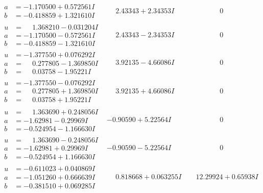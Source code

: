 \documentclass[1p]{elsarticle_modified}
\theoremstyle{definition}
\begin{document}
$$\begin{array}{c|c|c}
\begin{aligned}
a &= -1.170500 + 0.572561 I \\
b &= -0.418859 + 1.321610 I\end{aligned}
 & \phantom{-}2.43343 + 2.34353 I & \phantom{-0.000000 } 0 \\ \hline\begin{aligned}
u &= \phantom{-}1.368210 - 0.031204 I \\
a &= -1.170500 - 0.572561 I \\
b &= -0.418859 - 1.321610 I\end{aligned}
 & \phantom{-}2.43343 - 2.34353 I & \phantom{-0.000000 } 0 \\ \hline\begin{aligned}
u &= -1.377550 + 0.076292 I \\
a &= \phantom{-}0.277805 - 1.369850 I \\
b &= \phantom{-}0.03758 - 1.95221 I\end{aligned}
 & \phantom{-}3.92135 - 4.66086 I & \phantom{-0.000000 } 0 \\ \hline\begin{aligned}
u &= -1.377550 - 0.076292 I \\
a &= \phantom{-}0.277805 + 1.369850 I \\
b &= \phantom{-}0.03758 + 1.95221 I\end{aligned}
 & \phantom{-}3.92135 + 4.66086 I & \phantom{-0.000000 } 0 \\ \hline\begin{aligned}
u &= \phantom{-}1.363690 + 0.248056 I \\
a &= -1.62981 - 0.29969 I \\
b &= -0.524954 - 1.166630 I\end{aligned}
 & -0.90590 + 5.22564 I & \phantom{-0.000000 } 0 \\ \hline\begin{aligned}
u &= \phantom{-}1.363690 - 0.248056 I \\
a &= -1.62981 + 0.29969 I \\
b &= -0.524954 + 1.166630 I\end{aligned}
 & -0.90590 - 5.22564 I & \phantom{-0.000000 } 0 \\ \hline\begin{aligned}
u &= -0.611023 + 0.040869 I \\
a &= -1.051260 + 0.666639 I \\
b &= -0.381510 + 0.069285 I\end{aligned}
 & \phantom{-}0.818668 + 0.063255 I & \phantom{-}12.29924 + 0.65938 I\\

\end{array}$$
\end{document}
